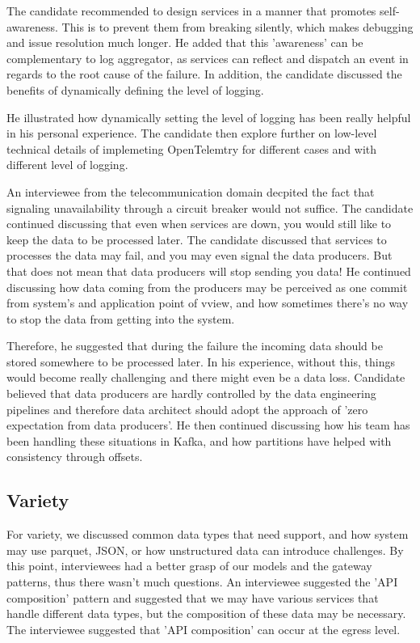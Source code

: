 \documentclass{bmcart}
\begin{document}
The candidate recommended to design services in a manner that promotes self-awareness. This is to prevent them from breaking silently, which makes debugging and issue resolution much longer. He added that this 'awareness' can be complementary to log aggregator, as services can reflect and dispatch an event in regards to the root cause of the failure. In addition, the candidate discussed the benefits of dynamically defining the level of logging. 

He illustrated how dynamically setting the level of logging has been really helpful in his personal experience. The candidate then explore further on low-level technical details of implemeting OpenTelemtry for different cases and with different level of logging.  

An interviewee from the telecommunication domain decpited the fact that signaling unavailability through a circuit breaker would not suffice. The candidate continued discussing that even when services are down, you would still like to keep the data to be processed later. The candidate discussed that services to processes the data may fail, and you may even signal the data producers. But that does not mean that data producers will stop sending you data! He continued discussing how data coming from the producers may be perceived as one commit from system's and application point of vview, and how sometimes there's no way to stop the data from getting into the system. 

Therefore, he suggested that during the failure the incoming data should be stored somewhere to be processed later. In his experience, without this, things would become really challenging and there might even be a data loss. Candidate believed that data producers are hardly controlled by the data engineering pipelines and therefore data architect should adopt the approach of 'zero expectation from data producers'. He then continued discussing how his team has been handling these situations in Kafka, and how partitions have helped with consistency through offsets. 


\subsection{Variety}

For variety, we discussed common data types that need support, and how system may use parquet, JSON, or how unstructured data can introduce challenges. By this point, interviewees had a better grasp of our models and the gateway patterns, thus there wasn't much questions. An interviewee suggested the 'API composition' pattern and suggested that we may have various services that handle different data types, but the composition of these data may be necessary. The interviewee suggested that 'API composition' can occur at the egress level. 
\end{document}
